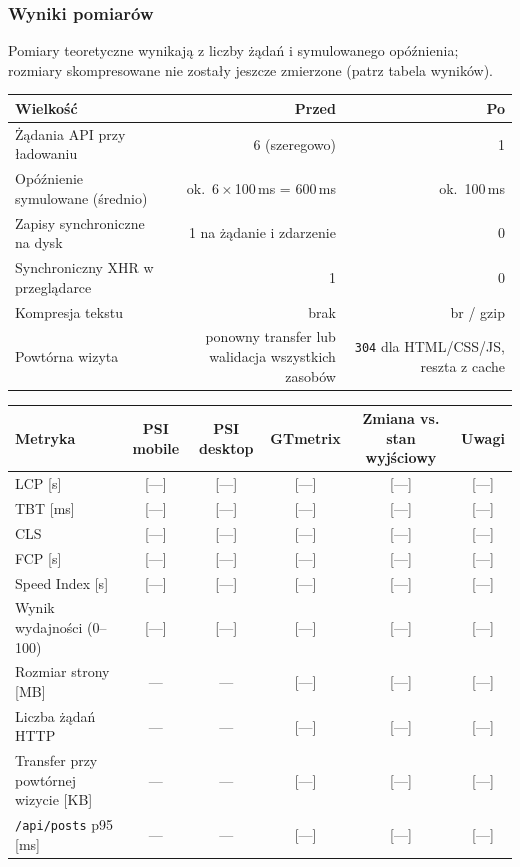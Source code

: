 \subsubsection{Wyniki pomiarów}

Pomiary teoretyczne wynikają z liczby żądań i symulowanego opóźnienia; rozmiary skompresowane
nie zostały jeszcze zmierzone (patrz tabela wyników).

\begin{tablehere}
\centering
\begin{tabular}{l r r}
\toprule
\textbf{Wielkość} & \textbf{Przed} & \textbf{Po} \\
\midrule
Żądania API przy ładowaniu & 6 (szeregowo) & 1 \\
Opóźnienie symulowane (średnio) & ok.\ 6\,$\times$\,100\,ms = 600\,ms & ok.\ 100\,ms \\
Zapisy synchroniczne na dysk & 1 na żądanie i zdarzenie & 0 \\
Synchroniczny XHR w przeglądarce & 1 & 0 \\
Kompresja tekstu & brak & br / gzip \\
Powtórna wizyta & ponowny transfer lub walidacja wszystkich zasobów & \texttt{304} dla HTML/CSS/JS, reszta z cache \\
\bottomrule
\end{tabular}
\caption{Zmiany w liczbie żądań i kosztach serwera}
\end{tablehere}

\begin{tablehere}
\centering
\begin{tabular}{l c c c c c}
\toprule
\textbf{Metryka} & \textbf{PSI mobile} & \textbf{PSI desktop} & \textbf{GTmetrix} & \textbf{Zmiana vs. stan wyjściowy} & \textbf{Uwagi} \\
\midrule
LCP [s]        & [—] & [—] & [—] & [—] & [—] \\
TBT [ms]       & [—] & [—] & [—] & [—] & [—] \\
CLS            & [—] & [—] & [—] & [—] & [—] \\
FCP [s]        & [—] & [—] & [—] & [—] & [—] \\
Speed Index [s]& [—] & [—] & [—] & [—] & [—] \\
\midrule
Wynik wydajności (0–100) & [—] & [—] & [—] & [—] & [—] \\
Rozmiar strony [MB]      & —   & —   & [—] & [—] & [—] \\
Liczba żądań HTTP        & —   & —   & [—] & [—] & [—] \\
Transfer przy powtórnej wizycie [KB] & — & — & [—] & [—] & [—] \\
\texttt{/api/posts} p95 [ms] & — & — & [—] & [—] & [—] \\
\bottomrule
\end{tabular}
\caption{Wyniki pomiarów dla optymalizacji sieci i serwera}
\end{tablehere}

